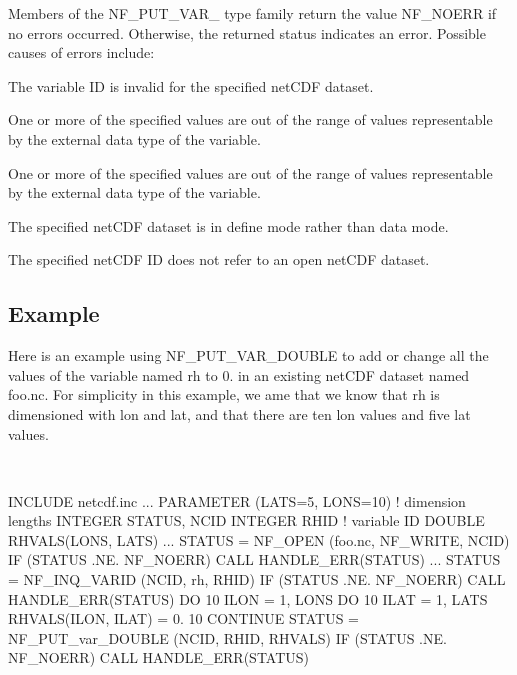 Members of the N\+F\+\_\+\+P\+U\+T\+\_\+\+V\+A\+R\+\_\+ type family return the value N\+F\+\_\+\+N\+O\+E\+RR if no errors occurred. Otherwise, the returned status indicates an error. Possible causes of errors include\+:


\begin{DoxyItemize}
\item The variable ID is invalid for the specified net\+C\+DF dataset.
\item One or more of the specified values are out of the range of values representable by the external data type of the variable.
\item One or more of the specified values are out of the range of values representable by the external data type of the variable.
\item The specified net\+C\+DF dataset is in define mode rather than data mode.
\item The specified net\+C\+DF ID does not refer to an open net\+C\+DF dataset.
\end{DoxyItemize}

\subsection*{Example }

Here is an example using N\+F\+\_\+\+P\+U\+T\+\_\+\+V\+A\+R\+\_\+\+D\+O\+U\+B\+LE to add or change all the values of the variable named rh to 0. in an existing net\+C\+DF dataset named foo.\+nc. For simplicity in this example, we ame that we know that rh is dimensioned with lon and lat, and that there are ten lon values and five lat values.

 

I\+N\+C\+L\+U\+DE \textquotesingle{}netcdf.\+inc\textquotesingle{} ... P\+A\+R\+A\+M\+E\+T\+ER (L\+A\+TS=5, L\+O\+NS=10) ! dimension lengths I\+N\+T\+E\+G\+ER S\+T\+A\+T\+US, N\+C\+ID I\+N\+T\+E\+G\+ER R\+H\+ID ! variable ID D\+O\+U\+B\+LE R\+H\+V\+A\+L\+S(\+L\+O\+N\+S, L\+A\+T\+S) ... S\+T\+A\+T\+US = N\+F\+\_\+\+O\+P\+EN (\textquotesingle{}foo.\+nc\textquotesingle{}, N\+F\+\_\+\+W\+R\+I\+TE, N\+C\+ID) IF (S\+T\+A\+T\+US .NE. N\+F\+\_\+\+N\+O\+E\+RR) C\+A\+LL H\+A\+N\+D\+L\+E\+\_\+\+E\+R\+R(\+S\+T\+A\+T\+U\+S) ... S\+T\+A\+T\+US = N\+F\+\_\+\+I\+N\+Q\+\_\+\+V\+A\+R\+ID (N\+C\+ID, \textquotesingle{}rh\textquotesingle{}, R\+H\+ID) IF (S\+T\+A\+T\+US .NE. N\+F\+\_\+\+N\+O\+E\+RR) C\+A\+LL H\+A\+N\+D\+L\+E\+\_\+\+E\+R\+R(\+S\+T\+A\+T\+U\+S) DO 10 I\+L\+ON = 1, L\+O\+NS DO 10 I\+L\+AT = 1, L\+A\+TS R\+H\+V\+A\+L\+S(\+I\+L\+O\+N, I\+L\+A\+T) = 0. 10 C\+O\+N\+T\+I\+N\+UE S\+T\+A\+T\+US = N\+F\+\_\+\+P\+U\+T\+\_\+var\+\_\+\+D\+O\+U\+B\+LE (N\+C\+ID, R\+H\+ID, R\+H\+V\+A\+LS) IF (S\+T\+A\+T\+US .NE. N\+F\+\_\+\+N\+O\+E\+RR) C\+A\+LL H\+A\+N\+D\+L\+E\+\_\+\+E\+R\+R(\+S\+T\+A\+T\+U\+S)

